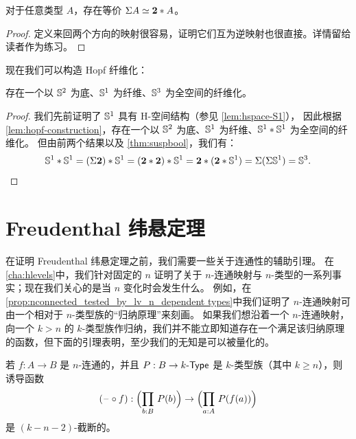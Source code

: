 \begin{lem}
  对于任意类型 $A$，存在等价 $\Sigma A \simeq \mathbf{2}*A$。
\end{lem}

\begin{proof}
  定义来回两个方向的映射很容易，证明它们互为逆映射也很直接。详情留给读者作为练习。
\end{proof}

现在我们可以构造 Hopf 纤维化：

\begin{thm}
  存在一个以 $\mathbb{S}^2$ 为底、$\mathbb{S}^1$ 为纤维、$\mathbb{S}^3$ 为全空间的纤维化。
\end{thm}

\begin{proof}
  我们先前证明了 $\mathbb{S}^1$ 具有 H-空间结构（参见 \cref{lem:hspace-S1}），
  因此根据 \cref{lem:hopf-construction}，存在一个以 $\mathbb{S}^2$ 为底、$\mathbb{S}^1$ 为纤维、$\mathbb{S}^1*\mathbb{S}^1$ 为全空间的纤维化。
  但由前两个结果以及 \cref{thm:suspbool}，我们有：
  \begin{equation*}
    \mathbb{S}^1*\mathbb{S}^1 = (\Sigma\mathbf{2})*\mathbb{S}^1
    =(\mathbf{2}*\mathbf{2})*\mathbb{S}^1
    =\mathbf{2}*(\mathbf{2}*\mathbb{S}^1)
    =\Sigma(\Sigma\mathbb{S}^1)
    =\mathbb{S}^3. \qedhere
  \end{equation*}
\end{proof}



\section{Freudenthal 纬悬定理}
\label{sec:freudenthal}

%
%

在证明 Freudenthal 纬悬定理之前，我们需要一些关于连通性的辅助引理。
在\cref{cha:hlevels}中，我们针对固定的 $n$ 证明了关于 $n$-连通映射与 $n$-类型的一系列事实；现在我们关心的是当 $n$ 变化时会发生什么。
例如，在\cref{prop:nconnected_tested_by_lv_n_dependent types}中我们证明了 $n$-连通映射可由一个相对于 $n$-类型族的``归纳原理''来刻画。
如果我们想沿着一个 $n$-连通映射，向一个 $k>n$ 的 $k$-类型族作归纳，我们并不能立即知道存在一个满足该归纳原理的函数，但下面的引理表明，至少我们的无知是可以被量化的。

\begin{lem}\label{thm:conn-trunc-variable-ind}
  若 $f:A\to B$ 是 $n$-连通的，并且 $P:B\to {k}\text-\mathsf{Type}$ 是 $k$-类型族（其中 $k\ge n$），则诱导函数
  \[ (\blank\circ f) : \Parens{\prd{b:B} P(b)} \to \Parens{\prd{a:A} P(f(a)) } \]
  是 $(k-n-2)$-截断的。
\end{lem}

